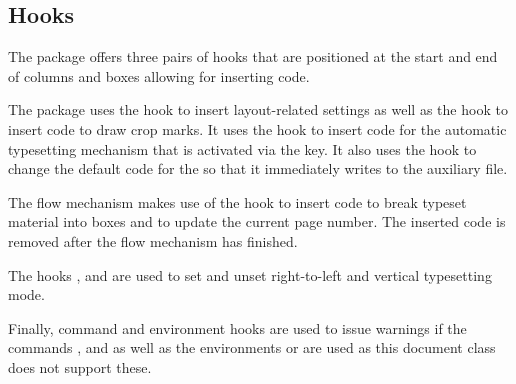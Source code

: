 \documentclass[a4paper]{article}
\begin{document}
\subsection{Hooks}

The package offers three pairs of hooks that are positioned at the start and end of columns and boxes allowing for inserting code.

The package uses the hook  to insert layout-related settings as well as the hook  to insert code to draw crop marks. It uses the hook  to insert code for the automatic typesetting mechanism that is activated via the  key. It also uses the hook  to change the default code for the \macro{\label} so that it immediately writes to the auxiliary file.

The flow mechanism makes use of the hook  to insert code to break typeset material into boxes and  to update the current page number. The inserted code is removed after the flow mechanism has finished.

{\raggedrightindent The hooks ,  and  are used to set and unset right-to-left and vertical typesetting mode. \par}

{\raggedrightindent Finally, command and environment hooks are used to issue warnings if the commands \macro{\footnote}, \macro{\footnotemark} and \macro{\footnotetext} as well as the environments  or  are used as this document class does not support these. \par}
\end{document}
